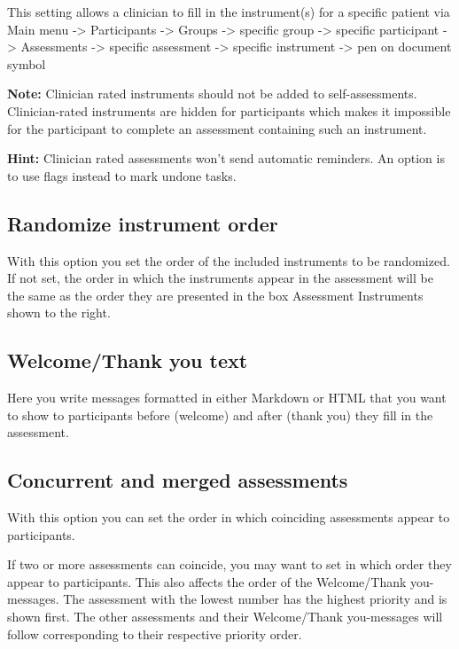 \documentclass[]{book}
\begin{document}
This setting allows a clinician to fill in the instrument(s) for a specific patient via Main menu -\textgreater{} Participants -\textgreater{} Groups -\textgreater{} specific group -\textgreater{} specific participant -\textgreater{} Assessments -\textgreater{} specific assessment -\textgreater{} specific instrument -\textgreater{} pen on document symbol

\textbf{Note:} Clinician rated instruments should not be added to self-assessments. Clinician-rated instruments are hidden for participants which makes it impossible for the participant to complete an assessment containing such an instrument.

\textbf{Hint:} Clinician rated assessments won't send automatic reminders. An option is to use flags instead to mark undone tasks.

\hypertarget{randomize-instrument-order}{%
\subsection{Randomize instrument order}\label{randomize-instrument-order}}

With this option you set the order of the included instruments to be randomized. If not set, the order in which the instruments appear in the assessment will be the same as the order they are presented in the box Assessment Instruments shown to the right.

\hypertarget{welcomethank-you-text}{%
\subsection{Welcome/Thank you text}\label{welcomethank-you-text}}

Here you write messages formatted in either Markdown or HTML that you want to show to participants before (welcome) and after (thank you) they fill in the assessment.

\hypertarget{concurrent-and-merged-assessments}{%
\subsection{Concurrent and merged assessments}\label{concurrent-and-merged-assessments}}

With this option you can set the order in which coinciding assessments appear to participants.

If two or more assessments can coincide, you may want to set in which order they appear to participants. This also affects the order of the Welcome/Thank you-messages. The assessment with the lowest number has the highest priority and is shown first. The other assessments and their Welcome/Thank you-messages will follow corresponding to their respective priority order.
\end{document}
